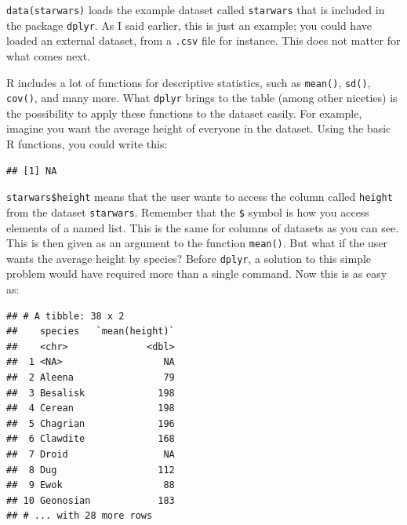\documentclass[]{gitbook}
\newenvironment{Shaded}{\begin{snugshade}}{\end{snugshade}}
\newcommand{\KeywordTok}[1]{\textcolor[rgb]{0.13,0.29,0.53}{\textbf{#1}}}
\newcommand{\NormalTok}[1]{#1}
\newcommand{\OperatorTok}[1]{\textcolor[rgb]{0.81,0.36,0.00}{\textbf{#1}}}
\newcommand{\StringTok}[1]{\textcolor[rgb]{0.31,0.60,0.02}{#1}}
\begin{document}
\texttt{data(starwars)} loads the example dataset called \texttt{starwars} that is included in the package \texttt{dplyr}.
As I said earlier, this is just an example; you could have loaded an external dataset, from a
\texttt{.csv} file for instance. This does not matter for what comes next.

R includes a lot of functions for descriptive statistics, such as \texttt{mean()}, \texttt{sd()}, \texttt{cov()}, and many
more. What \texttt{dplyr} brings to the table (among other niceties) is the possibility to apply these
functions to the dataset easily. For example, imagine you want the average height of everyone in
the dataset. Using the basic R functions, you could write this:

\begin{Shaded}
\end{Shaded}

\begin{verbatim}
## [1] NA
\end{verbatim}

\texttt{starwars\$height} means that the user wants to access the column called \texttt{height} from the dataset
\texttt{starwars}. Remember that the \texttt{\$} symbol is how you access elements of a named list. This is the
same for columns of datasets as you can see. This is then given as an argument to the function
\texttt{mean()}. But what if the user wants the average height by species? Before \texttt{dplyr}, a solution to
this simple problem would have required more than a single command. Now this is as easy as:

\begin{Shaded}
\end{Shaded}

\begin{verbatim}
## # A tibble: 38 x 2
##    species   `mean(height)`
##    <chr>              <dbl>
##  1 <NA>                  NA
##  2 Aleena                79
##  3 Besalisk             198
##  4 Cerean               198
##  5 Chagrian             196
##  6 Clawdite             168
##  7 Droid                 NA
##  8 Dug                  112
##  9 Ewok                  88
## 10 Geonosian            183
## # ... with 28 more rows
\end{verbatim}
\end{document}
